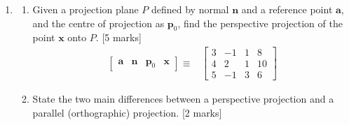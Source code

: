 \documentclass[11pt,a4paper,onecolumn]{tiet-question-paper}
\begin{document}
\begin{enumerate}[resume]
\item
  \begin{enumerate}
  \item Given a projection plane $P$ defined by normal
    $\textbf{n}$ and a reference point $\textbf{a}$,
    and the centre of projection as $\mathbf{p}_0$,
    find the perspective projection of the point
    $\textbf{x}$ onto $P$. \hfill [5 marks]
    \begin{align*}
      \begin{bmatrix}
        \mathbf{a}&\mathbf{n}&\mathbf{p}_0&\mathbf{x}
      \end{bmatrix}\equiv
      &
        \begin{bmatrix}
          3&-1&1&8\\4&2&1&10\\5&-1&3&6
        \end{bmatrix}
    \end{align*}
  \item State the two main differences between a
    perspective projection and a parallel (orthographic)
    projection. \hfill [2 marks]
  \end{enumerate}
\end{enumerate}
\bvrhrule[0.4pt]
\end{document}
